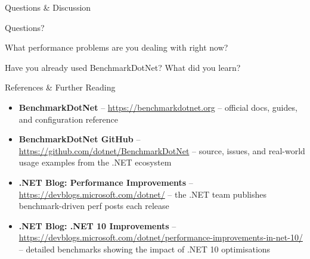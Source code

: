 \documentclass[aspectratio=1610, xcolor=table]{beamer}
\begin{document}
\begin{frame}{Questions \& Discussion}
	\begin{center}
		\vspace{2em}
		\Huge \textcolor{PrimaryAccent}{Questions?}
		\vspace{2em}

		\normalsize
		What performance problems are you dealing with right now?

		\vspace{1em}
		{\small Have you already used BenchmarkDotNet? What did you learn?}
	\end{center}
\end{frame}


\appendix

\begin{frame}[allowframebreaks]{References \& Further Reading}
	\small
	\begin{itemize}
		\item \textbf{BenchmarkDotNet} -- \url{https://benchmarkdotnet.org}
		      -- official docs, guides, and configuration reference

		\item \textbf{BenchmarkDotNet GitHub} --
		      \url{https://github.com/dotnet/BenchmarkDotNet} --
		      source, issues, and real-world usage examples from the .NET ecosystem

		\item \textbf{.NET Blog: Performance Improvements} --
		      \url{https://devblogs.microsoft.com/dotnet/} --
		      the .NET team publishes benchmark-driven perf posts each release

        \item \textbf{.NET Blog: .NET 10 Improvements} --
              \url{https://devblogs.microsoft.com/dotnet/performance-improvements-in-net-10/} --
              detailed benchmarks showing the impact of .NET 10 optimisations
	\end{itemize}
\end{frame}
\end{document}
